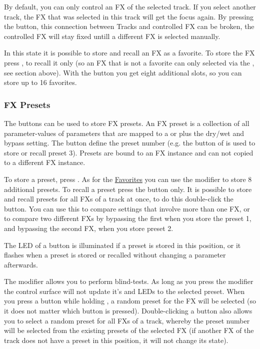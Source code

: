 By default, you can only control an FX of the selected track. If you
select another track, the FX that was selected in this track will get
the focus again. By pressing the \gv button, this connection between
Tracks and controlled FX can be broken, the controlled FX will stay
fixed untill a different FX is selected manually.

In this \gv state it is possible to store and recall an FX as a
favorite. To store the FX press \control \select, to recall it 
\select only (so an FX that is not a favorite can only selected via the
\vpots, see section above). With the \shift button you get eight
additional slots, so you can store up to 16 favorites.

\subsubsection{FX Presets}\label{fxpresets}

The \rec buttons can be used to store FX presets. An FX preset is a
collection of all parameter-values of parameters that are mapped to a
\fader or \vpot plus the dry/wet and bypass setting. The \rec button
define the preset number (e.g. the \rec button of  is used to
store or recall preset 3). Presets are bound to an FX instance and can
not copied to a different FX instance.

To store a preset, press \control \rec. As for the
\hyperref[fav]{Favorites} you can use the \shift modifier to store 8
additional presets. To recall a preset press  the \rec button only.
It is possible to store and recall presets for all FXs of a track at
once, to do this  double-click the \rec button. You can use
this to compare settings that involve more than one FX, or to compare
two different FXs by bypassing the first when you store the preset 1, and
bypassing the second FX, when you store preset 2.

The LED of a \rec button is illuminated if a preset is stored in this
position, or it flashes when a preset is stored or recalled without
changing a parameter afterwards.

The \alt modifier allows you to perform blind-tests. As long as you
press the \alt modifier the control surface will not update it's
\faders and LEDs to the selected preset. When you press a \rec button
while holding \alt, a random preset for the FX will be selected (so it
does not matter which \rec button is pressed). Double-clicking a \rec
button also allows you to select a random preset for all FXs of a
track, whereby the preset number will be selected from the existing
presets of the selected FX (if another FX of the track does not have a
preset in this position, it will not change its state).

